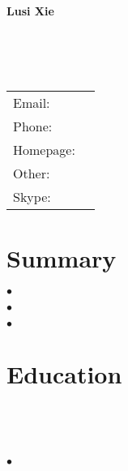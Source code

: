 \documentclass[letterpaper]{article}
\def\name{Lusi Xie}
\renewenvironment{itemize}{
  \begin{list}{}{
    \setlength{\leftmargin}{1.5em}
  }
}{
  \end{list}
}
\begin{document}

\centerline{\huge \bf \name}

\vspace{0.25in}

\begin{minipage}{0.65\linewidth}
   \\ %
   \\ %
   \\ %
\end{minipage}
\begin{minipage}{0.25\linewidth}
  \begin{tabular}{ll}
    Email: &  \href{mailto:}{\tt } \\
    Phone: &  \\
    Homepage: & \href{}{\tt } \\ 
    Other: & \href}{\faGithub}  \href{}{\faLinkedin}
    \href{}{\faTwitter}\\
    Skype: &  \\

  \end{tabular}
\end{minipage}

\vspace{-0.1in}

\section*{Summary}
\begin{itemize}
	\setlength{\itemindent}{-.12in}
	\item $\bullet$  \\[-0.25in]
	\item $\bullet$  \\[-0.25in]
	\item $\bullet$  \\[-0.25in]

\end{itemize}

\vspace{-0.15in}

\section*{Education}
\begin{itemize}
  \item \textbf{} \hfill{} \\[-0.25in] %
  \item \textit{}\\[-0.25in] %
	\begin{itemize}
  		\setlength{\itemindent}{-.16in}
  		\item $\bullet$  \\[-0.2in]
  	\end{itemize}
\end{itemize}
\end{document}
